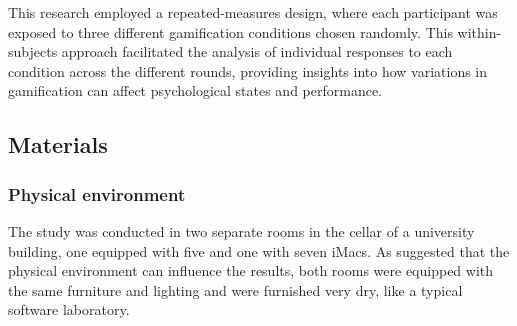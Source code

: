 This research employed a repeated-measures design, where each participant was exposed to three different gamification conditions chosen randomly.
This within-subjects approach facilitated the analysis of individual responses to each condition across the different rounds, providing insights into how variations in gamification can affect psychological states and performance.

\subsection{Materials}
\subsubsection{Physical environment}
The study was conducted in two separate rooms in the cellar of a university building, one equipped with five and one with seven iMacs.
As \textcite{christyLeaderboardsVirtualClassroom2014} suggested that the physical environment can influence the results, both rooms were equipped with the same furniture and lighting and were furnished very dry, like a typical software laboratory.

